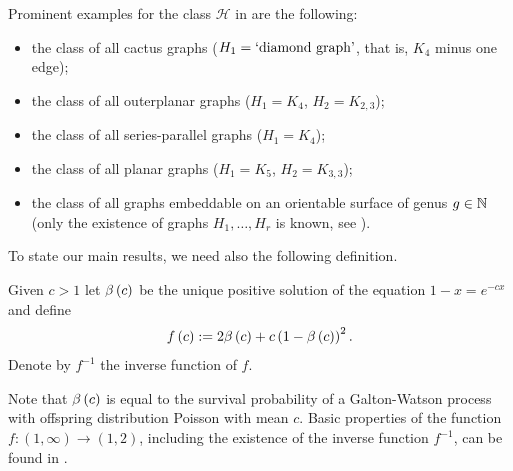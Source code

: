 Prominent examples for the class $\mathcal{H}$ in  are the following:
\begin{itemize}
	\item
	the class of all cactus graphs ($H_1=\text{\lq diamond graph\rq}$, that is, $K_4$ minus one edge);
	\item
	the class of all outerplanar graphs ($H_1=K_4$, $H_2=K_{2,3}$);
	\item
	the class of all series-parallel graphs ($H_1=K_4$);
	\item
	the class of all planar graphs ($H_1=K_5$, $H_2=K_{3,3}$);
	\item
	the class of all graphs embeddable on an orientable surface of genus $g\in\mathbb{N}$ (only the existence of graphs $H_1, \ldots, H_r$ is known, see \cite{RobertsonSeymour1990}).
\end{itemize}

To state our main results, we need also the following definition.
\begin{definition}\label{PPdef:func}
Given $c>1$ let $\beta\left(c\right)$ be the unique positive solution of the equation $1-x=e^{-cx}$ and define 
\begin{align*}
f\left(c\right):=2\beta\left(c\right)+c\left(1-\beta\left(c\right)\right)^2.
\end{align*}
Denote by $f^{-1}$ the inverse function of $f$.
\end{definition}

Note that $\beta\left(c\right)$ is equal to the survival probability of a Galton-Watson process with offspring distribution Poisson with mean $c$.
Basic properties of the function $f:\left(1,\infty\right)\to \left(1,2\right)$, including the existence of the inverse function $f^{-1}$, can be found in .

